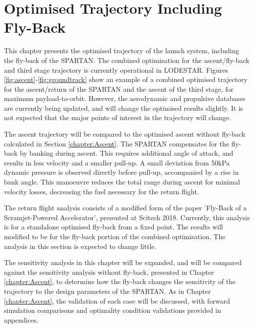 
\cleardoublepage
\chapter{Optimised Trajectory Including Fly-Back}\label{chapter:Flyback}

This chapter presents the optimised trajectory of the launch system, including the fly-back of the SPARTAN. The combined optimisation for the ascent/fly-back and third stage trajectory is currently operational in LODESTAR. Figures \ref{fig:ascent}-\ref{fig:groundtrack} show an example of a combined optimised trajectory for the ascent/return of the SPARTAN and the ascent of the third stage, for maximum payload-to-orbit. However, the aerodynamic and propulsive databases are currently being updated, and will change the optimised results slightly. It is not expected that the major points of interest in the trajectory will change.



 The ascent trajectory will be compared to the optimised ascent without fly-back calculated in Section \ref{chapter:Ascent}. The SPARTAN compensates for the fly-back by banking during ascent. This requires additional angle of attack, and results in less velocity and a smaller pull-up. A small deviation from 50kPa dynamic pressure is observed directly before pull-up, accompanied by a rise in bank angle. This manoeuvre reduces the total range during ascent for minimal velocity losses, decreasing the fuel necessary for the return flight. 
 

The return flight analysis consists of a modified form of the paper 'Fly-Back of a Scramjet-Powered Accelerator', presented at Scitech 2018. Currently, this analysis is for a standalone optimised fly-back from a fixed point.  The results will modified to be for the fly-back portion of the combined optimisation. The analysis in this section is expected to change little. 



The sensitivity analysis in this chapter will be expanded, and will be compared against the sensitivity analysis without fly-back, presented in Chapter \ref{chapter:Ascent}, to determine how the fly-back changes the sensitivity of the trajectory to the design parameters of the SPARTAN. As in Chapter \ref{chapter:Ascent}, the validation of each case will be discussed, with forward simulation comparisons and optimality condition validations provided in appendices. 




